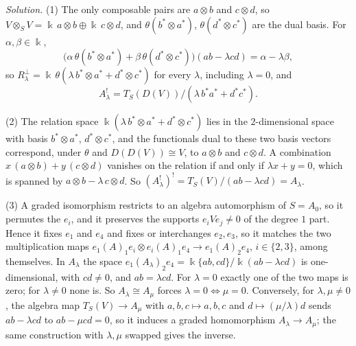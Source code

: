 \begin{hidden}
\emph{Solution.}
(1) The only composable pairs are $a\otimes b$ and $c\otimes d$, so $V\otimes_SV=\Bbbk\,a\otimes b\oplus\Bbbk\,c\otimes d$, and $\theta(b^*\otimes a^*)$, $\theta(d^*\otimes c^*)$ are the dual basis.
For $\alpha,\beta\in\Bbbk$,
\[
\bigl(\alpha\,\theta(b^*\otimes a^*)+\beta\,\theta(d^*\otimes c^*)\bigr)(ab-\lambda cd)=\alpha-\lambda\beta,
\]
so $R_\lambda^\perp=\Bbbk\,\theta(\lambda\,b^*\otimes a^*+d^*\otimes c^*)$ for every $\lambda$, including $\lambda=0$, and
\[
A_\lambda^!=T_S(D(V))/(\lambda\,b^*a^*+d^*c^*).
\]

(2) The relation space $\Bbbk(\lambda\,b^*\otimes a^*+d^*\otimes c^*)$ lies in the $2$-dimensional space with basis $b^*\otimes a^*$, $d^*\otimes c^*$, and the functionals dual to these two basis vectors correspond, under $\theta$ and $D(D(V))\cong V$, to $a\otimes b$ and $c\otimes d$.
A combination $x\,(a\otimes b)+y\,(c\otimes d)$ vanishes on the relation if and only if $\lambda x+y=0$, which is spanned by $a\otimes b-\lambda\,c\otimes d$.
So $(A_\lambda^!)^!=T_S(V)/(ab-\lambda cd)=A_\lambda$.

(3) A graded isomorphism restricts to an algebra automorphism of $S=A_0$, so it permutes the $e_i$, and it preserves the supports $e_iVe_j\neq0$ of the degree $1$ part.
Hence it fixes $e_1$ and $e_4$ and fixes or interchanges $e_2,e_3$, so it matches the two multiplication maps $e_1(A)_1e_i\otimes e_i(A)_1e_4\to e_1(A)_2e_4$, $i\in\{2,3\}$, among themselves.
In $A_\lambda$ the space $e_1(A_\lambda)_2e_4=\Bbbk\{ab,cd\}/\Bbbk(ab-\lambda cd)$ is one-dimensional, with $cd\neq0$, and $ab=\lambda cd$.
For $\lambda=0$ exactly one of the two maps is zero; for $\lambda\neq0$ none is.
So $A_\lambda\cong A_\mu$ forces $\lambda=0\Leftrightarrow\mu=0$.
Conversely, for $\lambda,\mu\neq0$, the algebra map $T_S(V)\to A_\mu$ with $a,b,c\mapsto a,b,c$ and $d\mapsto(\mu/\lambda)d$ sends $ab-\lambda cd$ to $ab-\mu cd=0$, so it induces a graded homomorphism $A_\lambda\to A_\mu$; the same construction with $\lambda,\mu$ swapped gives the inverse.
\end{hidden}


